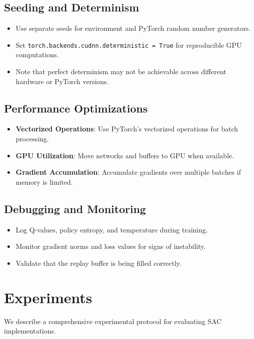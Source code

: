 \documentclass[conference]{IEEEtran}
\begin{document}
\subsection{Seeding and Determinism}
\begin{itemize}
  \item Use separate seeds for environment and PyTorch random number generators.
  \item Set \texttt{torch.backends.cudnn.deterministic = True} for reproducible GPU computations.
  \item Note that perfect determinism may not be achievable across different hardware or PyTorch versions.
\end{itemize}

\subsection{Performance Optimizations}
\begin{itemize}
  \item \textbf{Vectorized Operations}: Use PyTorch's vectorized operations for batch processing.
  \item \textbf{GPU Utilization}: Move networks and buffers to GPU when available.
  \item \textbf{Gradient Accumulation}: Accumulate gradients over multiple batches if memory is limited.
\end{itemize}

\subsection{Debugging and Monitoring}
\begin{itemize}
  \item Log Q-values, policy entropy, and temperature during training.
  \item Monitor gradient norms and loss values for signs of instability.
  \item Validate that the replay buffer is being filled correctly.
\end{itemize}

\section{Experiments}
We describe a comprehensive experimental protocol for evaluating SAC implementations.
\end{document}
